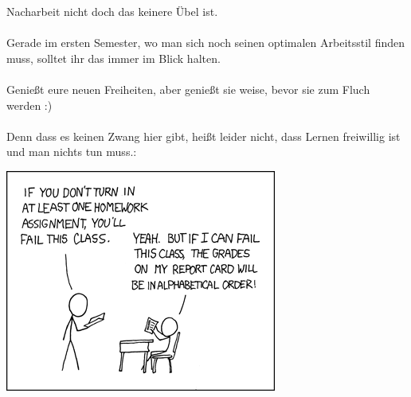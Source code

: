 	Nacharbeit nicht doch das keinere Übel ist. \\\\
	Gerade im ersten Semester, wo man sich noch seinen optimalen
	Arbeitsstil finden muss, solltet ihr das immer im Blick
	halten.\\\\
	Genießt eure neuen Freiheiten, aber genießt sie weise, bevor sie
	zum Fluch werden :)\\\\
	Denn dass es keinen Zwang hier gibt, heißt leider nicht, dass
	Lernen freiwillig ist und man nichts tun muss.: 
	
	
\begin{center}
\includegraphics[totalheight=6cm]{bilder/XKCD/priorities}
\end{center}
